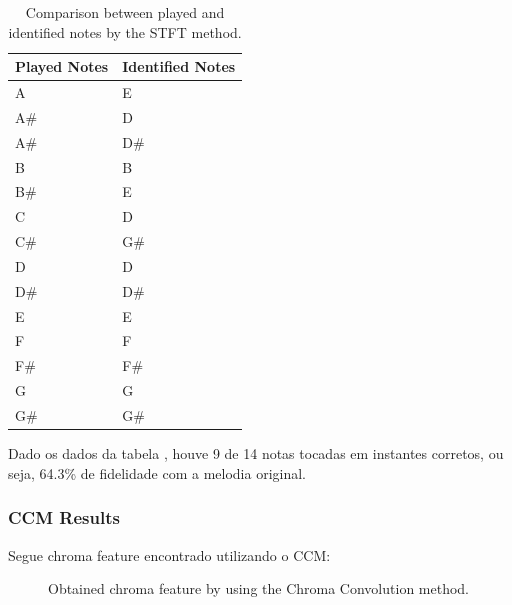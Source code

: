\documentclass{article}
\begin{document}
	\begin{table}[h]
	 \begin{center}
	 \begin{tabular}{|l|l|}
	  \hline
	  Played Notes & Identified Notes \\
	  \hline
	  A  & E \\
	  A\#  & D \\
	  A\#  & D\# \\
	  B  & B \\
	  B\#  & E \\
	  C  & D \\
	  C\#  & G\# \\
	  D  & D \\
	  D\#  & D\# \\
	  E  & E \\
	  F  & F \\
	  F\#  & F\# \\
	  G  & G \\
	  G\#  & G\# \\
	  \hline
	 \end{tabular}
	\end{center}
	 \caption{Comparison between played and identified notes by the STFT method.}
	 \label{tab:table-1-sfft}
	\end{table}

	Dado os dados da tabela , houve 9 de 14 notas tocadas em instantes corretos, ou seja, 64.3\% de fidelidade com a melodia original.


	\subsubsection{CCM Results}
	Segue chroma feature encontrado utilizando o CCM:
	
	\begin{figure}[h]
	 \centerline{}
	 \caption{Obtained chroma feature by using the Chroma Convolution method.}
	 \label{fig:1-ccm}
	\end{figure}	
\end{document}
